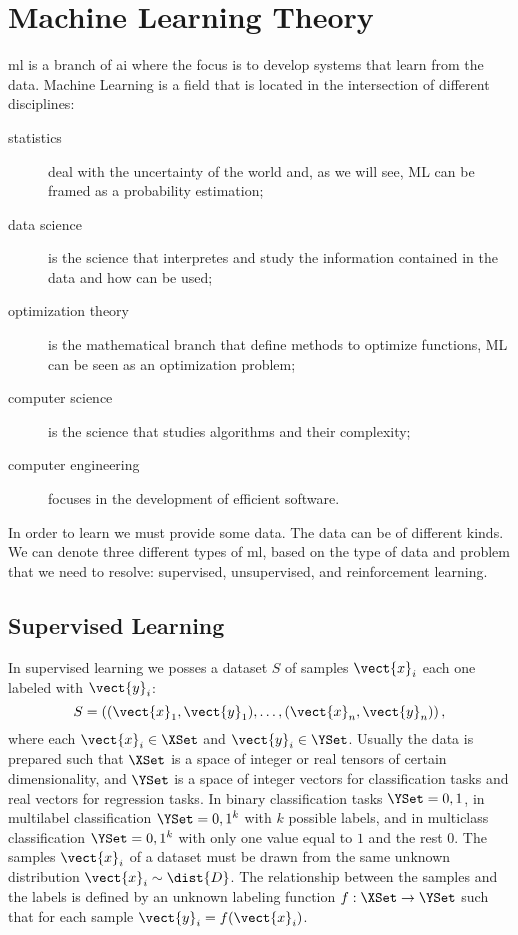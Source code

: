 \section{Machine Learning Theory}
\ac{ml} is a branch of \ac{ai}
where the focus is to develop systems that learn from the
data. Machine Learning is a field that is located in the intersection
of different disciplines:
\begin{description}
\item[statistics] deal with the uncertainty of the world and, as we
  will see, ML can be framed as a probability estimation;
\item[data science] is the science that interpretes and study the
  information contained in the data and how can be used;
\item[optimization theory] is the mathematical branch that define
  methods to optimize functions, ML can be seen as an optimization
  problem;
\item[computer science] is the science that studies algorithms and
  their complexity;
\item[computer engineering] focuses in the development of efficient
  software.
\end{description}

In order to learn we must provide some data. The data can be of
different kinds. We can denote three different types of \ac{ml}, based
on the type of data and problem that we need to resolve: supervised,
unsupervised, and reinforcement learning.

\subsection{Supervised Learning}\label{sec:supervisedTheory}
In supervised learning we posses a dataset $S$ of samples $\vect{x}_i$
each one labeled with $\vect{y}_i$:
\begin{equation*}
  S=\left((\vect{x}_1,\vect{y}_1),\dots,(\vect{x}_n,\vect{y}_n)\right),
\end{equation*}
where each $\vect{x}_i\in\XSet$ and $\vect{y}_i\in\YSet$. Usually the
data is prepared such that $\XSet$ is a space of integer or real
tensors of certain dimensionality, and $\YSet$ is a space of integer
vectors for classification tasks and real vectors for regression
tasks. In binary classification tasks $\YSet={0,1}$, in multilabel
classification $\YSet={0,1}^k$ with $k$ possible labels, and in
multiclass classification $\YSet={0,1}^k$ with only one value equal to
$1$ and the rest $0$. The samples $\vect{x}_i$ of a dataset must be
drawn from the same unknown distribution $\vect{x}_i\sim\dist{D}$. The
relationship between the samples and the labels is defined by an unknown
labeling function $f:\XSet\rightarrow\YSet$ such that for each sample
$\vect{y}_i=f(\vect{x}_i)$.

